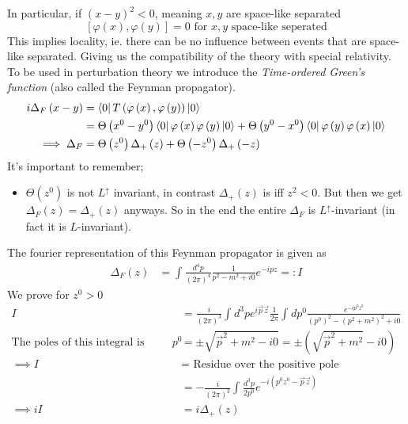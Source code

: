 \documentclass{report}
\begin{document}
In particular, if $\left( x-y \right) ^2 <0$, meaning $x,y$ are space-like separated \[
\left[ \varphi\left( x \right) , \varphi\left( y \right)  \right] = 0 \text{  for  } x,y \text{ space-like seperated}
\] 
This implies locality, ie. there can be no influence between events that are space-like separated. Giving us the compatibility of the theory with special relativity.\\
To be used in perturbation theory we introduce the \emph{Time-ordered Green's function} (also called the Feynman propagator).
\begin{align*}
  i \Delta_F\left( x-y \right) &= \bra{0} T\left( \varphi\left( x \right) , \varphi\left( y \right)  \right) \ket{0}  \\
  &= \Theta\left( x^{0} - y^{0}  \right) \bra{0} \varphi\left( x \right) \varphi\left( y \right) \ket{0} + \Theta\left( y^{0} - x^{0}  \right) \bra{0} \varphi\left( y \right) \varphi\left( x \right) \ket{0}  \\
  \implies \Delta_F &=  \Theta\left( z^{0}  \right) \Delta_+\left( z \right) + \Theta\left( -z^{0}  \right) \Delta_+\left( -z \right) \\
\end{align*}
It's important to remember;
\begin{itemize}
  \item $\Theta\left( z^{0}  \right) $ is not $L^{\uparrow} $ invariant, in contrast $\Delta_+\left( z \right) $ is iff $z^2 < 0$. But then we get $\Delta_F\left( z \right) = \Delta_+\left( z \right) $ anyways. So in the end the entire $\Delta_F$ is $L^{\uparrow} $-invariant (in fact it is $L$-invariant). 
\end{itemize}
The fourier representation of this Feynman propagator is given as
\begin{align*}
  \Delta_F\left( z \right) &= \int_{}^{} \frac{d^{4} p}{\left( 2\pi \right) ^{4} } \frac{1}{p^2 - m^2 + i 0} e^{-ipz} =: I
\end{align*}
We prove for $z^{0} >0$
\begin{align*}
  I &=  \frac{i}{\left( 2\pi \right) ^3} \int_{}^{} d^3p e^{i\vec{p} \vec{z} } \frac{1}{2\pi} \int_{}^{}   dp^{0}  \frac{e^{-ip^{0} z^{0} } }{\left( p^{0}  \right) ^2 - \left( p^2 + m^2 \right)^2 + i 0 }  \\
  \text{The poles of this integral is given as: }  p^{0} &= \pm \sqrt{\vec{p}^2 + m^2 - i 0} = \pm \left( \sqrt{\vec{p}^2 + m^2} - i 0 \right) \\
\implies I &=  \text{ Residue over the positive pole} \\
&= - \frac{i}{\left( 2\pi \right) ^3} \int_{}^{} \frac{d^3p}{2p^{0} } e^{-i \left( p^{0} z^{0} - \vec{p}\vec{z} \right) } \\
\implies i I&=  i \Delta_+\left( z \right) \\
\end{align*}
\end{document}
